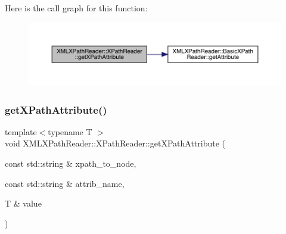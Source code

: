 Here is the call graph for this function\+:
\nopagebreak
\begin{figure}[H]
\begin{center}
\leavevmode
\includegraphics[width=350pt]{d3/d5a/classXMLXPathReader_1_1XPathReader_a0a5ca67826c2c8fdad784a3bbbba4b3c_cgraph}
\end{center}
\end{figure}
\mbox{\label{classXMLXPathReader_1_1XPathReader_a0a5ca67826c2c8fdad784a3bbbba4b3c}} 
\subsubsection{\texorpdfstring{getXPathAttribute()}{getXPathAttribute()}\hspace{0.1cm}{\footnotesize\ttfamily [2/3]}}
{\footnotesize\ttfamily template$<$typename T $>$ \\
void X\+M\+L\+X\+Path\+Reader\+::\+X\+Path\+Reader\+::get\+X\+Path\+Attribute (\begin{DoxyParamCaption}\item[{const std\+::string \&}]{xpath\+\_\+to\+\_\+node,  }\item[{const std\+::string \&}]{attrib\+\_\+name,  }\item[{T \&}]{value }\end{DoxyParamCaption})\hspace{0.3cm}{\ttfamily [inline]}}

